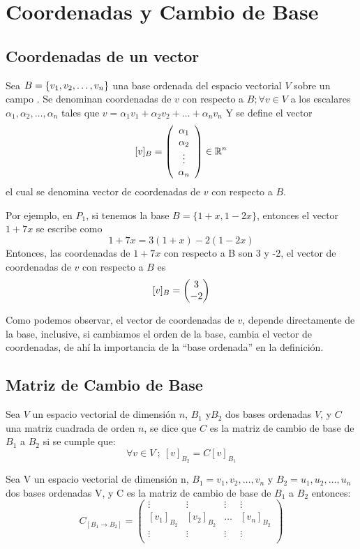 
\chapter{Coordenadas y Cambio de Base}
\section{Coordenadas de un vector}
\begin{dfn} 

Sea $B= \lbrace v_1, v_2, \ldots, v_n \rbrace$ una base ordenada del espacio vectorial $V$ sobre un campo \dobleK. Se denominan coordenadas de $v$ con respecto a $B; \forall v \in V$ a los escalares $\alpha _1,\alpha_2, \hdots, \alpha _n$ tales que
$v=\alpha_1 v_1+\alpha_2 v_2+ \hdots + \alpha_n v_n$
Y se define el vector $$[v]_B = \left( \begin{array}{c} \alpha_1\\ \alpha_2\\ \vdots\\ \alpha_n \end{array} \right)  \in  \mathbb{R}^n$$ el cual se denomina vector de coordenadas de $v$ con respecto a $B$. 
\end{dfn}

Por ejemplo, en $P_1$, si tenemos la base $B=\{1+x,1-2x\}$, entonces el vector $1+7x$ se escribe como
$$1+7x=3(1+x)-2(1-2x)$$
Entonces, las coordenadas de $1+7x$ con respecto a B son 3 y -2, el vector de coordenadas de $v$ con respecto a $B$ es $$[v]_B=\begin{pmatrix} 3\\ -2\\ \end{pmatrix} $$

Como podemos observar, el vector de coordenadas de $v$, depende directamente de la base, inclusive, si cambiamos el orden de la base, cambia el vector de coordenadas, de ahí la importancia de la “base ordenada” en la definición.

\section{Matriz de Cambio de Base}
\begin{dfn} Sea $V$ un espacio vectorial de dimensión $n$, $ B_1$  y$ B_2$  dos bases ordenadas $V$, y $C$ una matriz cuadrada de orden $n$, se dice que $C$ es la matriz de cambio de base de $B_1$ a $B_2$ si se cumple que:
$$\forall v \in V \ ; \ [v]_{B_2}=C[v]_{B_1}$$
\end{dfn}

\begin{theorem}


Sea V un espacio vectorial de dimensión n, $B_1={v_1,v_2,…,v_n }$  y $B_2={u_1,u_2,…,u_n}$  dos bases ordenadas V, y C es la matriz de cambio de base de $B_1$ a $B_2$ entonces:
\[C_{[B_1 \rightarrow B_2]}= \begin{pmatrix}
\vdots & \vdots & \vdots & \vdots\\
\left[v_1\right]_{B_2}&\left[v_2\right]_{B_2}& \hdots & \left[v_n\right]_{B_2}\\
\vdots & \vdots & \vdots & \vdots\\
\end{pmatrix}\]
\end{theorem}

